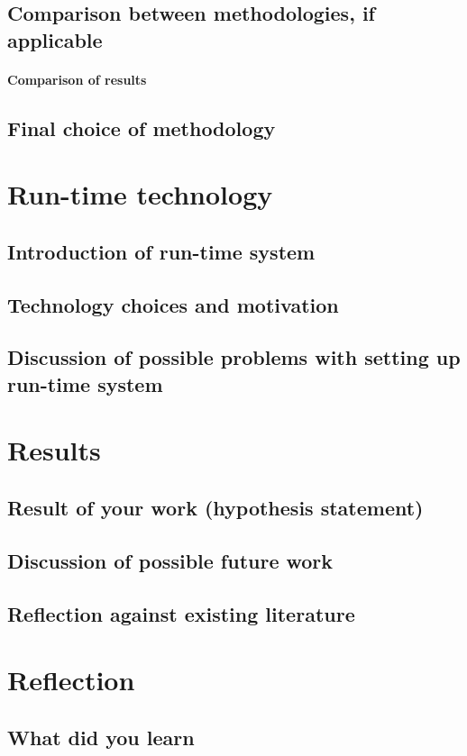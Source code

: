\documentclass[journal,10pt]{IEEEtran}
\begin{document}
\subsection{Comparison between methodologies, if applicable}
\paragraph{Comparison of results}

\subsection{Final choice of methodology}



\section{Run-time technology}

\subsection{Introduction of run-time system}

\subsection{Technology choices and motivation}

\subsection{Discussion of possible problems with setting up run-time system}



\section{Results}

\subsection{Result of your work (hypothesis statement)}

\subsection{Discussion of possible future work}

\subsection{Reflection against existing literature}



\section{Reflection}

\subsection{What did you learn}


  

\end{document}

